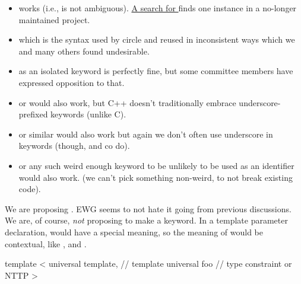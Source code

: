 \documentclass{wg21}
\begin{document}
\begin{itemize}

\item {} works (i.e., is not ambiguous). \href{https://tinyurl.com/pth8v9p7}{A search for }
finds one instance in a no-longer maintained project.

\item {} which is the syntax used by circle and  reused  in inconsistent ways
which we and many others found undesirable.

\item {} as an isolated keyword is perfectly fine, but some committee members have expressed opposition to that.

\item {} or  would also work, but C++ doesn't traditionally embrace underscore-prefixed keywords (unlike C).

\item {} or similar would also work but again we don't often use underscore in keywords (though,  and co do).

\item {} or any such weird enough keyword to be unlikely to be used as an identifier would also work. (we can't pick something non-weird, to not break existing code).

\end{itemize}

We are proposing . EWG seems to not hate it going from previous discussions.
We are, of course, \emph{not} proposing to make  a keyword.
In a template parameter declaration,  would have a special meaning, so the meaning of  would be
contextual, like ,  and .


\begin{colorblock}
template <
        universal template, // template
        universal foo       // type constraint or NTTP
>
\end{colorblock}

%
\end{document}
